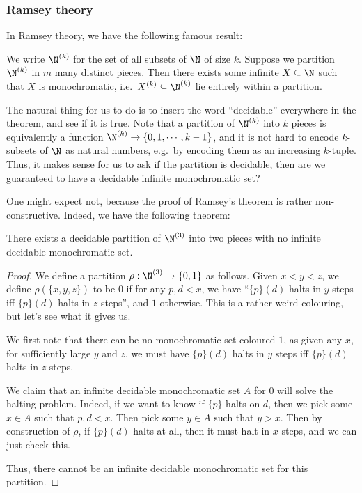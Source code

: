 \documentclass[a4paper]{article}
\begin{document}
\subsubsection*{Ramsey theory}
In Ramsey theory, we have the following famous result:
\begin{thm}
  We write $\N^{(k)}$ for the set of all subsets of $\N$ of size $k$. Suppose we partition $\N^{(k)}$ in $m$ many distinct pieces. Then there exists some infinite $X \subseteq \N$ such that $X$ is monochromatic, i.e.\ $X^{(k)} \subseteq \N^{(k)}$ lie entirely within a partition.
\end{thm}
The natural thing for us to do is to insert the word ``decidable'' everywhere in the theorem, and see if it is true. Note that a partition of $\N^{(k)}$ into $k$ pieces is equivalently a function $\N^{(k)} \to \{0, 1, \cdots, k - 1\}$, and it is not hard to encode $k$-subsets of $\N$ as natural numbers, e.g.\ by encoding them as an increasing $k$-tuple. Thus, it makes sense for us to ask if the partition is decidable, then are we guaranteed to have a decidable infinite monochromatic set?

One might expect not, because the proof of Ramsey's theorem is rather non-constructive. Indeed, we have the following theorem:
\begin{thm}[Jockusch]
  There exists a decidable partition of $\N^{(3)}$ into two pieces with no infinite decidable monochromatic set.
\end{thm}

\begin{proof}
  We define a partition $\rho: \N^{(3)} \to \{0, 1\}$ as follows. Given $x < y < z$, we define $\rho(\{x, y, z\})$ to be $0$ if for any $p, d < x$, we have ``$\{p\}(d)$ halts in $y$ steps iff $\{p\}(d)$ halts in $z$ steps'', and $1$ otherwise. This is a rather weird colouring, but let's see what it gives us.

  We first note that there can be no monochromatic set coloured $1$, as given any $x$, for sufficiently large $y$ and $z$, we must have $\{p\}(d)$ halts in $y$ steps iff $\{p\}(d)$ halts in $z$ steps.

  We claim that an infinite decidable monochromatic set $A$ for $0$ will solve the halting problem. Indeed, if we want to know if $\{p\}$ halts on $d$, then we pick some $x \in A$ such that $p, d < x$. Then pick some $y \in A$ such that $y > x$. Then by construction of $\rho$, if $\{p\}(d)$ halts at all, then it must halt in $x$ steps, and we can just check this.

  Thus, there cannot be an infinite decidable monochromatic set for this partition.
\end{proof}
\end{document}
